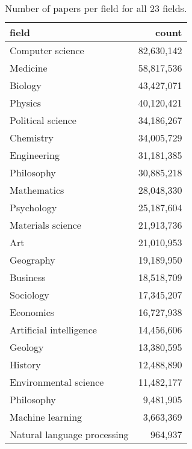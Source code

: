\begin{table}
\caption{Number of papers per field for all 23 fields.}
\begin{tabular}{lr}
\toprule
field & count \\
\midrule
Computer science & 82,630,142 \\
Medicine & 58,817,536 \\
Biology & 43,427,071 \\
Physics & 40,120,421 \\
Political science & 34,186,267 \\
Chemistry & 34,005,729 \\
Engineering & 31,181,385 \\
Philosophy & 30,885,218 \\
Mathematics & 28,048,330 \\
Psychology & 25,187,604 \\
Materials science & 21,913,736 \\
Art & 21,010,953 \\
Geography & 19,189,950 \\
Business & 18,518,709 \\
Sociology & 17,345,207 \\
Economics & 16,727,938 \\
Artificial intelligence & 14,456,606 \\
Geology & 13,380,595 \\
History & 12,488,890 \\
Environmental science & 11,482,177 \\
Philosophy & 9,481,905 \\
Machine learning & 3,663,369 \\
Natural language processing & 964,937 \\
\bottomrule
\end{tabular}
\end{table}
